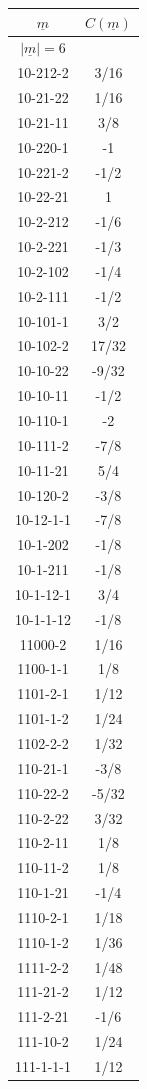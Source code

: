 \begin{tabular}[t]{|cc|}
\hline
$\underline{m}$ & $C(\underline{m})$\\
\hline\hline
$|\underline{m}|=6$&\\
\hline
10-212-2 &  3/16\\
10-21-22 &  1/16\\
10-21-11 &  3/8\\
10-220-1 &  -1\\
10-221-2 &  -1/2\\
10-22-21 &  1\\
10-2-212 &  -1/6\\
10-2-221 &  -1/3\\
10-2-102 &  -1/4\\
10-2-111 &  -1/2\\
10-101-1 &  3/2\\
10-102-2 &  17/32\\
10-10-22 &  -9/32\\
10-10-11 &  -1/2\\
10-110-1 &  -2\\
10-111-2 &  -7/8\\
10-11-21 &  5/4\\
10-120-2 &  -3/8\\
10-12-1-1 &  -7/8\\
10-1-202 &  -1/8\\
10-1-211 &  -1/8\\
10-1-12-1 &  3/4\\
10-1-1-12 &  -1/8\\
11000-2 &  1/16\\
1100-1-1 &  1/8\\
1101-2-1 &  1/12\\
1101-1-2 &  1/24\\
1102-2-2 &  1/32\\
110-21-1 &  -3/8\\
110-22-2 &  -5/32\\
110-2-22 &  3/32\\
110-2-11 &  1/8\\
110-11-2 &  1/8\\
110-1-21 &  -1/4\\
1110-2-1 &  1/18\\
1110-1-2 &  1/36\\
1111-2-2 &  1/48\\
111-21-2 &  1/12\\
111-2-21 &  -1/6\\
111-10-2 &  1/24\\
111-1-1-1 &  1/12\\

\end{tabular}
